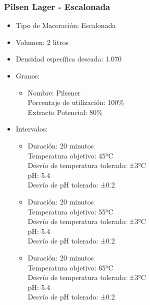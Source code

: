                 \subsubsection{Pilsen Lager - Escalonada} 
                \begin{itemize}
                    \item Tipo de Maceración: Escalonada
                    \item Volumen: 2 litros
                    \item Densidad específica deseada: 1.070
                    \item Granos:
                        \begin{itemize}
                            \item Nombre: Pilsener \\
                                Porcentaje de utilización: 100\% \\
                                Extracto Potencial: 80\%
                        \end{itemize}
                    \item Intervalos:
                        \begin{itemize}
                            \item Duración: 20 minutos \\
                             Temperatura objetivo: 45°C \\
                             Desvío de temperatura tolerado: ±3°C \\
                             pH: 5.4 \\
                             Desvío de pH tolerado: ±0.2 \\
                             \item Duración: 20 minutos \\
                             Temperatura objetivo: 55°C \\
                             Desvío de temperatura tolerado: ±3°C \\
                             pH: 5.4 \\
                             Desvío de pH tolerado: ±0.2 \\
                             \item Duración: 20 minutos \\
                             Temperatura objetivo: 65°C \\
                             Desvío de temperatura tolerado: ±3°C \\
                             pH: 5.4 \\
                             Desvío de pH tolerado: ±0.2 \\
                        \end{itemize}
                \end{itemize}
